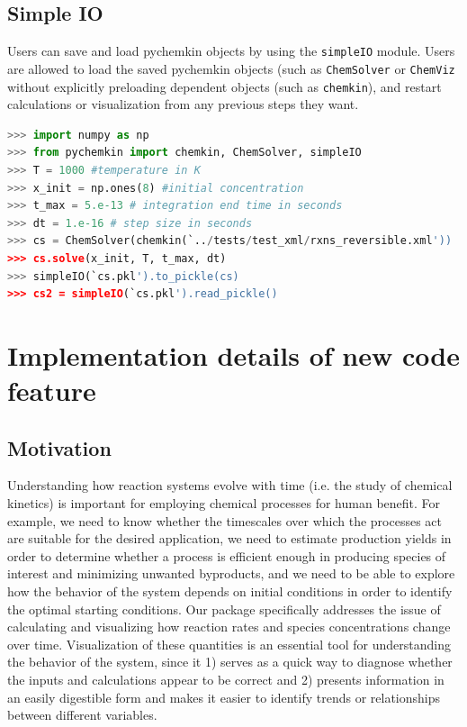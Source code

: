 \documentclass[12pt]{article}
\begin{document}
\subsection{Simple IO}
Users can save and load pychemkin objects by using the \texttt{simpleIO} module. Users are allowed to load the saved pychemkin objects (such as \texttt{ChemSolver} or \texttt{ChemViz} without explicitly preloading dependent objects (such as \texttt{chemkin}), and restart calculations or visualization from any previous steps they want.

\begin{lstlisting}[language = Python, basicstyle = \ttfamily,columns = fullflexible, showstringspaces = False]
>>> import numpy as np
>>> from pychemkin import chemkin, ChemSolver, simpleIO
>>> T = 1000 #temperature in K
>>> x_init = np.ones(8) #initial concentration
>>> t_max = 5.e-13 # integration end time in seconds
>>> dt = 1.e-16 # step size in seconds
>>> cs = ChemSolver(chemkin(`../tests/test_xml/rxns_reversible.xml'))
>>> cs.solve(x_init, T, t_max, dt)
>>> simpleIO(`cs.pkl').to_pickle(cs)
>>> cs2 = simpleIO(`cs.pkl').read_pickle()
\end{lstlisting}

\section{Implementation details of new code feature}
\subsection{Motivation}
Understanding how reaction systems evolve with time (i.e. the study of chemical kinetics) is important for employing chemical processes for human benefit. For example, we need to know whether the timescales over which the processes act are suitable for the desired application, we need to estimate production yields in order to determine whether a process is efficient enough in producing species of interest and minimizing unwanted byproducts, and we need to be able to explore how the behavior of the system depends on initial conditions in order to identify the optimal starting conditions. Our package specifically addresses the issue of calculating and visualizing how reaction rates and species concentrations change over time. Visualization of these quantities is an essential tool for understanding the behavior of the system, since it 1) serves as a quick way to diagnose whether the inputs and calculations appear to be correct and 2) presents information in an easily digestible form and makes it easier to identify trends or relationships between different variables. 
\end{document}
